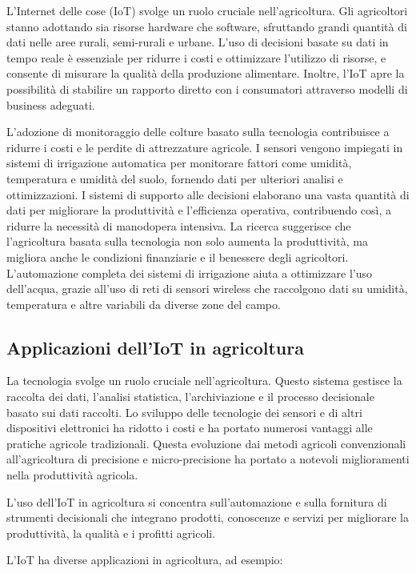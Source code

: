 L'Internet delle cose (IoT) svolge un ruolo cruciale nell'agricoltura. Gli agricoltori stanno adottando sia risorse hardware che software, sfruttando grandi quantità di dati nelle aree rurali, semi-rurali e urbane. L'uso di decisioni basate su dati in tempo reale è essenziale per ridurre i costi e ottimizzare l'utilizzo di risorse, e consente di misurare la qualità della produzione alimentare. Inoltre, l'IoT apre la possibilità di stabilire un rapporto diretto con i consumatori attraverso modelli di business adeguati.

L'adozione di monitoraggio delle colture basato sulla tecnologia contribuisce a ridurre i costi e le perdite di attrezzature agricole. I sensori vengono impiegati in sistemi di irrigazione automatica per monitorare fattori come umidità, temperatura e umidità del suolo, fornendo dati per ulteriori analisi e ottimizzazioni. I sistemi di supporto alle decisioni elaborano una vasta quantità di dati per migliorare la produttività e l'efficienza operativa, contribuendo così, a ridurre la necessità di manodopera intensiva. La ricerca suggerisce che l'agricoltura basata sulla tecnologia non solo aumenta la produttività, ma migliora anche le condizioni finanziarie e il benessere degli agricoltori. L'automazione completa dei sistemi di irrigazione aiuta a ottimizzare l'uso dell'acqua, grazie all'uso di reti di sensori wireless che raccolgono dati su umidità, temperatura e altre variabili da diverse zone del campo.

\subsection{Applicazioni dell'IoT in agricoltura}

La tecnologia svolge un ruolo cruciale nell'agricoltura. Questo sistema gestisce la raccolta dei dati, l'analisi statistica, l'archiviazione e il processo decisionale basato sui dati raccolti. Lo sviluppo delle tecnologie dei sensori e di altri dispositivi elettronici ha ridotto i costi e ha portato numerosi vantaggi alle pratiche agricole tradizionali. Questa evoluzione dai metodi agricoli convenzionali all'agricoltura di precisione e micro-precisione ha portato a notevoli miglioramenti nella produttività agricola.

L'uso dell'IoT in agricoltura si concentra sull'automazione e sulla fornitura di strumenti decisionali che integrano prodotti, conoscenze e servizi per migliorare la produttività, la qualità e i profitti agricoli.

L'IoT ha diverse applicazioni in agricoltura, ad esempio:

